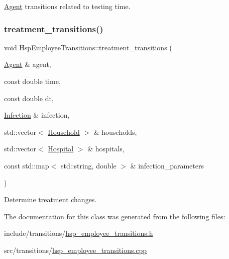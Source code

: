 \hyperlink{classAgent}{Agent} transitions related to testing time. 

\mbox{\label{classHspEmployeeTransitions_a9aa0351e356529e3125a45128d7b330b}} 
\subsubsection{\texorpdfstring{treatment\+\_\+transitions()}{treatment\_transitions()}}
{\footnotesize\ttfamily void Hsp\+Employee\+Transitions\+::treatment\+\_\+transitions (\begin{DoxyParamCaption}\item[{\hyperlink{classAgent}{Agent} \&}]{agent,  }\item[{const double}]{time,  }\item[{const double}]{dt,  }\item[{\hyperlink{classInfection}{Infection} \&}]{infection,  }\item[{std\+::vector$<$ \hyperlink{classHousehold}{Household} $>$ \&}]{households,  }\item[{std\+::vector$<$ \hyperlink{classHospital}{Hospital} $>$ \&}]{hospitals,  }\item[{const std\+::map$<$ std\+::string, double $>$ \&}]{infection\+\_\+parameters }\end{DoxyParamCaption})}



Determine treatment changes. 



The documentation for this class was generated from the following files\+:\begin{DoxyCompactItemize}
\item 
include/transitions/\hyperlink{hsp__employee__transitions_8h}{hsp\+\_\+employee\+\_\+transitions.\+h}\item 
src/transitions/\hyperlink{hsp__employee__transitions_8cpp}{hsp\+\_\+employee\+\_\+transitions.\+cpp}\end{DoxyCompactItemize}
